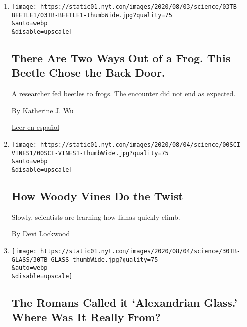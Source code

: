 \begin{enumerate}
\def\labelenumi{\arabic{enumi}.}
\item
  \href{/2020/08/03/science/beetle-frog-poop.html}{}

  \texttt{[image: https://static01.nyt.com/images/2020/08/03/science/03TB-BEETLE1/03TB-BEETLE1-thumbWide.jpg?quality=75\\\&auto=webp\\\&disable=upscale]}

  \hypertarget{there-are-two-ways-out-of-a-frog-this-beetle-chose-the-back-door}{%
  \subsection{There Are Two Ways Out of a Frog. This Beetle Chose the
  Back
  Door.}\label{there-are-two-ways-out-of-a-frog-this-beetle-chose-the-back-door}}

  A researcher fed beetles to frogs. The encounter did not end as
  expected.

  By Katherine J. Wu

  \href{https://www.nytimes.com/es/2020/08/04/espanol/ciencia-y-tecnologia/escarabajo-excremento-rana.html}{Leer
  en español}
\item
  \href{/2020/08/01/science/vines-lianas-panama.html}{}

  \texttt{[image: https://static01.nyt.com/images/2020/08/04/science/00SCI-VINES1/00SCI-VINES1-thumbWide.jpg?quality=75\\\&auto=webp\\\&disable=upscale]}

  \hypertarget{how-woody-vines-do-the-twist}{%
  \subsection{How Woody Vines Do the
  Twist}\label{how-woody-vines-do-the-twist}}

  Slowly, scientists are learning how lianas quickly climb.

  By Devi Lockwood
\item
  \href{/2020/07/31/science/alexandrian-glass-rome.html}{}

  \texttt{[image: https://static01.nyt.com/images/2020/08/04/science/30TB-GLASS/30TB-GLASS-thumbWide.jpg?quality=75\\\&auto=webp\\\&disable=upscale]}

  \hypertarget{the-romans-called-it-alexandrian-glass-where-was-it-really-from}{%
  \subsection{The Romans Called it `Alexandrian Glass.' Where Was It
  Really
  From?}\label{the-romans-called-it-alexandrian-glass-where-was-it-really-from}}


\end{enumerate}
